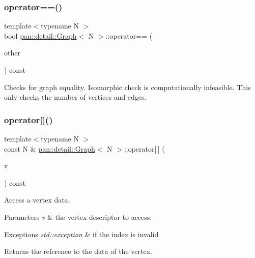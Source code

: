 \subsubsection{\texorpdfstring{operator==()}{operator==()}}
{\footnotesize\ttfamily template$<$typename N $>$ \\
bool \hyperlink{classpan_1_1detail_1_1_graph}{pan\+::detail\+::\+Graph}$<$ N $>$\+::operator== (\begin{DoxyParamCaption}\item[{const \hyperlink{classpan_1_1detail_1_1_graph}{Graph}$<$ N $>$ \&}]{other }\end{DoxyParamCaption}) const\hspace{0.3cm}{\ttfamily [inline]}}

Checks for graph equality. Isomorphic check is computationally infeasible. This only checks the number of vertices and edges. \mbox{\label{classpan_1_1detail_1_1_graph_a912822dad64cd9df929011c45e5a532d}} 
\subsubsection{\texorpdfstring{operator[]()}{operator[]()}\hspace{0.1cm}{\footnotesize\ttfamily [1/2]}}
{\footnotesize\ttfamily template$<$typename N $>$ \\
const N \& \hyperlink{classpan_1_1detail_1_1_graph}{pan\+::detail\+::\+Graph}$<$ N $>$\+::operator\mbox{[}$\,$\mbox{]} (\begin{DoxyParamCaption}\item[{\hyperlink{classpan_1_1detail_1_1_graph_a462f566d2f6cb0e51c85c8e9fa5382ab}{Vertex\+Descriptor}}]{v }\end{DoxyParamCaption}) const\hspace{0.3cm}{\ttfamily [inline]}}

Access a vertex data. 
\begin{DoxyParams}{Parameters}
{\em v} & the vertex descriptor to access. \\
\hline
\end{DoxyParams}

\begin{DoxyExceptions}{Exceptions}
{\em std\+::exception} & if the index is invalid \\
\hline
\end{DoxyExceptions}
\begin{DoxyReturn}{Returns}
the reference to the data of the vertex. 
\end{DoxyReturn}
\mbox{\label{classpan_1_1detail_1_1_graph_a5e902bbe95d75a0af812af3fd95314c2}} 
